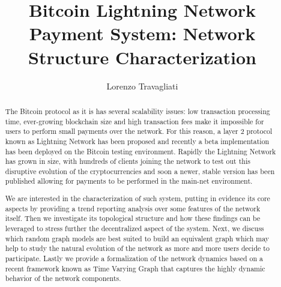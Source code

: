 \documentclass[LaM, oneside, english, noexaminfo]{sapthesis}
\title{Bitcoin Lightning Network Payment System: Network Structure Characterization}
\author{Lorenzo Travagliati}
\theoremstyle{definition}
\begin{document}
	
	\frontmatter
	\maketitle
	
	\dedication{Dedicato a\\ i miei nonni.}
	\begin{abstract}
	The Bitcoin protocol as it is has several scalability issues: low transaction processing time, ever-growing blockchain size and high transaction fees make it impossible for users to perform small payments over the network. For this reason, a layer 2 protocol known as Lightning Network has been proposed and recently a beta implementation has been deployed on the Bitcoin testing environment. Rapidly the Lightning Network has grown in size, with hundreds of clients joining the network to test out this disruptive evolution of the cryptocurrencies and soon a newer, stable version has been published allowing for payments to be performed in the main-net environment.
	
	We are interested in the characterization of such system, putting in evidence its core aspects by providing a trend reporting analysis over some features of the network itself. Then we investigate its topological structure and how these findings can be leveraged to stress further the decentralized aspect of the system. Next, we discuss which random graph models are best suited to build an equivalent graph which may help to study the natural evolution of the network as more and more users decide to participate. Lastly we provide a formalization of the network dynamics based on a recent framework known as Time Varying Graph that captures the highly dynamic behavior of the network components.
	\end{abstract}
	
	\tableofcontents
	\mainmatter
	\setlength{\parskip}{1em}
	
	
	
	
	
	
	
	
	
\end{document}
